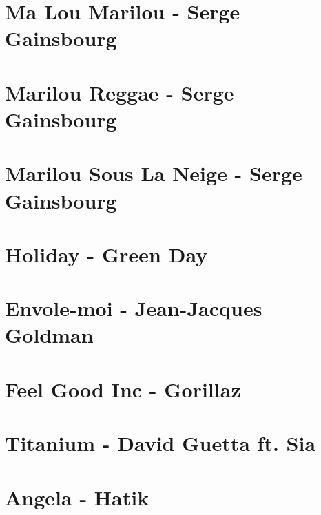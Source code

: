 \documentclass[11pt]{article}
\begin{document}
\section{Ma Lou Marilou - Serge Gainsbourg}
\begin{guitar}

\end{guitar}

\section{Marilou Reggae - Serge Gainsbourg}
\begin{guitar}

\end{guitar}

\section{Marilou Sous La Neige - Serge Gainsbourg}
\begin{guitar}

\end{guitar}

\section*{Holiday - Green Day}

\section{Envole-moi - Jean-Jacques Goldman}


\section{Feel Good Inc - Gorillaz}


\section{Titanium - David Guetta ft. Sia}
\begin{guitar}

\end{guitar}

\section{Angela - Hatik}
\begin{guitar}

\end{guitar}
\end{document}
